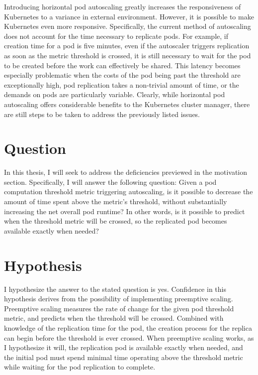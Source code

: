 \documentclass[letterpaper,11pt,twocolumn]{article}
\begin{document}
Introducing horizontal pod autoscaling greatly increases the responsiveness of
Kubernetes to a variance in external environment.
However, it is possible to make Kubernetes even more responsive. Specifically,
the current method of autoscaling does not account for the time necessary to
replicate pods. For example, if creation time for a pod is five minutes, even if
the autoscaler triggers replication as soon as the metric threshold is
crossed, it is still necessary to wait for the pod to be created before the work can
effectively be shared. This latency becomes especially problematic when the
costs of the pod being past the threshold are exceptionally high, pod
replication takes a non-trivial amount of time, or the demands on pods are
particularly variable. Clearly, while horizontal pod autoscaling offers
considerable benefits to the Kubernetes cluster manager, there are still steps
to be taken to address the previously listed issues.

\section{Question}

In this thesis, I will seek to address the deficiencies previewed in the
motivation section. Specifically, I will answer the following question: Given a
pod computation threshold metric triggering autoscaling, is it possible
to decrease the amount of time spent above the metric's threshold,
without substantially increasing the
net overall pod runtime? In other words, is it possible to predict when the
threshold metric will be crossed, so the replicated pod becomes available
exactly when needed?

\section{Hypothesis}

I hypothesize the answer to the stated question is yes. Confidence in this
hypothesis derives from the possibility of implementing preemptive
scaling.\cite{brendan-burns-conversation} Preemptive scaling measures the rate
of change for the given pod threshold metric, and predicts when the threshold
will be crossed. Combined with knowledge of the replication time for the pod,
the creation process for the replica can begin before the threshold is ever
crossed. When preemptive scaling works, as I hypothesize it will, the
replication pod is available exactly when needed, and the initial pod must spend
minimal time operating above the threshold metric while waiting for the pod
replication to complete.
\end{document}
